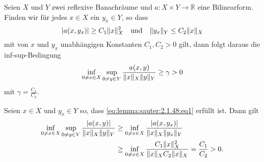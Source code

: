\begin{Lemma}
\label{lemma:sauter:2.1.48}
    Seien $X$ und $Y$ zwei reflexive Banachräume und $a \colon X \times Y \to \mathbb{R}$ eine Bilinearform.
    Finden wir für jedes $x \in X$ ein $y_{x} \in Y$, so dass
    \begin{equation}
        \label{eq:lemma:sauter:2.1.48:eq1}
        \lvert a(x, y_{x})\rvert \geq C_{1} \lVert x\rVert_{X}^{2} \quad \text{und} \quad \lVert y_{x}\rVert_{Y} \leq C_{2} \lVert x\rVert_{X}
    \end{equation}
    mit von $x$ und $y_{x}$ unabhängigen Konstanten $C_{1}, C_{2} > 0$ gilt, dann folgt daraus die inf-sup-Bedingung
    \begin{equation}
    \label{eq:lemma:sauter:2.1.48:inf_sup}
        \inf_{0 \neq x \in X} \sup_{0 \neq y \in Y} \frac{a(x, y)}{\lVert x\rVert_{X}\lVert y\rVert_{Y}} \geq \gamma > 0
    \end{equation}
    mit $\gamma = \frac{C_{1}}{C_{2}}$.

    \begin{Beweis}
        Seien $x \in X$ und $y_{x} \in Y$ so, dass \eqref{eq:lemma:sauter:2.1.48:eq1} erfüllt ist.
        Dann gilt
        \begin{align}
            \inf_{0 \neq x \in X} \sup_{0 \neq y \in Y} \frac{\lvert a(x, y)\rvert}{\lVert x\rVert_{X} \lVert y\rVert_{Y}}
            &\geq
            \inf_{0 \neq x \in X} \frac{\lvert a(x, y_{x})\rvert}{\lVert x\rVert_{X} \lVert y_{x}\rVert_{Y}}
            \\&\geq
            \inf_{0 \neq x \in X} \frac{C_{1} \lVert x\rVert^{2}_{X}}{\lVert x\rVert_{X} C_{2} \lVert x\rVert_{X}}
            =
            \frac{C_{1}}{C_{2}}
            > 0.
        \end{align}
    \end{Beweis}
\end{Lemma}

